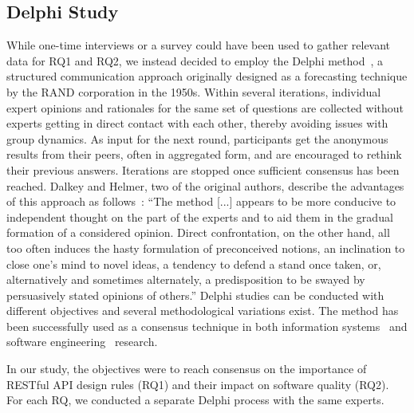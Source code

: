 \documentclass[runningheads]{llncs}
\begin{document}
\subsection{Delphi Study}
While one-time interviews or a survey could have been used to gather relevant data for RQ1 and RQ2, we instead decided to employ the Delphi method~\cite{Dalkey1963}, a structured communication approach originally designed as a forecasting technique by the RAND corporation in the 1950s.
Within several iterations, individual expert opinions and rationales for the same set of questions are collected without experts getting in direct contact with each other, thereby avoiding issues with group dynamics.
As input for the next round, participants get the anonymous results from their peers, often in aggregated form, and are encouraged to rethink their previous answers.
Iterations are stopped once sufficient consensus has been reached.
Dalkey and Helmer, two of the original authors, describe the advantages of this approach as follows~\cite{Dalkey1963}:
\enquote{The method [...] appears to be more conducive to independent thought on the part of the experts and to aid them in the gradual formation of a considered opinion.
Direct confrontation, on the other hand, all too often induces the hasty formulation of preconceived notions, an inclination to close one’s mind to novel ideas, a tendency to defend a stand once taken, or, alternatively and sometimes alternately, a predisposition to be swayed by persuasively stated opinions of others.}
Delphi studies can be conducted with different objectives and several methodological variations exist.
The method has been successfully used as a consensus technique in both information systems~\cite{Okoli2004} and software engineering~\cite{Lilja2011} research.

In our study, the objectives were to reach consensus on the importance of RESTful API design rules (RQ1) and their impact on software quality (RQ2).
For each RQ, we conducted a separate Delphi process with the same experts.
\end{document}

